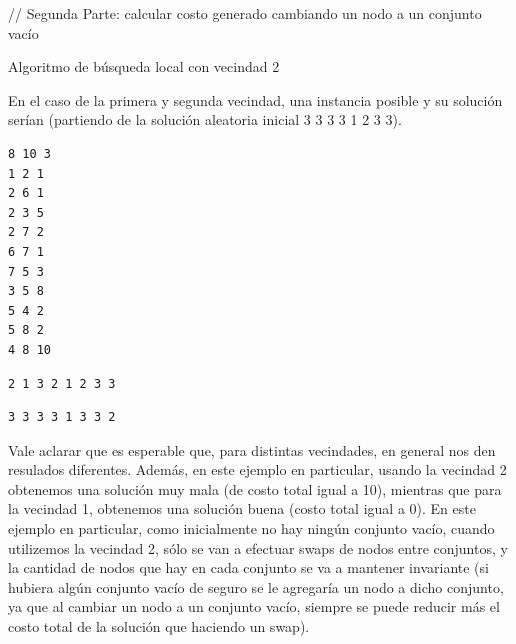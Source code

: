 \documentclass[11pt, a4paper, twoside]{article}
\begin{document}
\begin{enumerate}
\begin{algorithm}[H]
{{				
			}
			
			// Segunda Parte: calcular costo generado cambiando un nodo a un conjunto vacío \\
		}
		\caption{Algoritmo de búsqueda local con vecindad 2}
		\end{algorithm}
		
		En el caso de la primera  y segunda vecindad, una instancia posible y su solución serían (partiendo de la solución 
		aleatoria inicial 3 3 3 3 1 2 3 3). \\

		
\begin{minipage}[t]{0.4\textwidth}
\begin{Verbatim}[frame=single,framesep=1cm,label= Ejemplo de entrada]
8 10 3
1 2 1
2 6 1
2 3 5
2 7 2
6 7 1
7 5 3
3 5 8
5 4 2
5 8 2
4 8 10
\end{Verbatim}
\end{minipage}
\hfill
\begin{minipage}[t]{0.4\textwidth}
\begin{Verbatim}[frame=single,framesep=1cm,label= Ejemplo de salida: vecindad 1]
2 1 3 2 1 2 3 3
\end{Verbatim}
\hfill
\begin{Verbatim}[frame=single,framesep=1cm,label= Ejemplo de salida: vecindad 2]
3 3 3 3 1 3 3 2
\end{Verbatim}
\end{minipage}
		
		Vale aclarar que es esperable que, para distintas vecindades, en general nos den resulados diferentes. Además, en este ejemplo
		en particular, usando la vecindad 2 obtenemos una solución muy mala (de costo total igual a 10), mientras que para la vecindad 1,
		obtenemos una solución buena (costo total igual a 0). En este ejemplo en particular, como inicialmente no hay ningún conjunto vacío,
		cuando utilizemos la vecindad 2, sólo se van a efectuar swaps de nodos entre conjuntos, y la cantidad de nodos que hay en cada conjunto
		se va a mantener invariante (si hubiera algún conjunto vacío de seguro se le agregaría un nodo a dicho conjunto, ya que al cambiar un nodo
		a un conjunto vacío, siempre se puede reducir más el costo total de la solución que haciendo un swap). \\
		

\end{enumerate}
\end{document}
